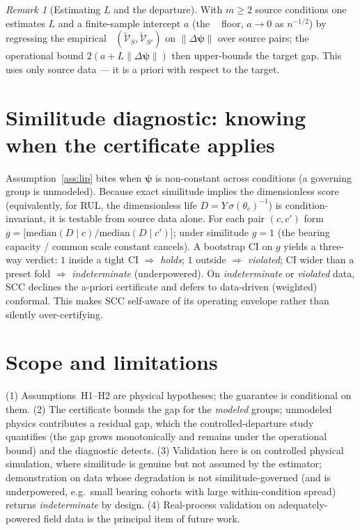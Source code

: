 \documentclass[11pt]{article}
\theoremstyle{definition}
\theoremstyle{remark}
\newtheorem{remark}{Remark}
\DeclareMathOperator{\dtv}{d_{\mathrm{TV}}}
\newcommand{\lawt}[1]{\tilde{\mathcal{V}}_{#1}}
\begin{document}
\begin{remark}[Estimating $L$ and the departure]
With $m\ge2$ source conditions one estimates $L$ and a finite-sample intercept $a$
(the $\dtv$ floor, $a\to0$ as $n^{-1/2}$) by regressing the empirical
$\dtv(\lawt S,\lawt{S'})$ on $\lVert\Delta\boldsymbol\psi\rVert$ over source pairs; the
operational bound $2(a+L\lVert\Delta\boldsymbol\psi\rVert)$ then upper-bounds the target
gap. This uses only source data --- it is a priori with respect to the target.

\end{remark}

\section{Similitude diagnostic: knowing when the certificate applies}\label{sec:diag}
Assumption~\ref{ass:lip} bites when $\boldsymbol\psi$ is non-constant across conditions
(a governing group is unmodeled). Because exact similitude implies the dimensionless score (equivalently, for
RUL, the dimensionless life $D=Y\,\sigma(\theta_c)^{-1}$) is condition-invariant, it is
testable from source data alone. For each pair $(c,c')$ form
$g=\big[\text{median}(D\mid c)/\text{median}(D\mid c')\big]$; under similitude $g=1$
(the bearing capacity / common scale constant cancels). A bootstrap CI on $g$ yields a
three-way verdict: $1$ inside a tight CI $\Rightarrow$ \emph{holds}; $1$ outside
$\Rightarrow$ \emph{violated}; CI wider than a preset fold $\Rightarrow$
\emph{indeterminate} (underpowered). On \emph{indeterminate} or \emph{violated} data,
SCC declines the a-priori certificate and defers to data-driven (weighted) conformal.
This makes SCC self-aware of its operating envelope rather than silently
over-certifying.

\section{Scope and limitations}
(1) Assumptions~H1--H2 are physical hypotheses; the guarantee is conditional on them.
(2) The certificate bounds the gap for the \emph{modeled} groups; unmodeled physics
contributes a residual gap, which the controlled-departure study quantifies (the gap
grows monotonically and remains under the operational bound) and the diagnostic
detects. (3) Validation here is on controlled physical simulation, where similitude is
genuine but not assumed by the estimator; demonstration on data whose degradation is
not similitude-governed (and is underpowered, e.g.\ small bearing cohorts with large
within-condition spread) returns \emph{indeterminate} by design. (4) Real-process
validation on adequately-powered field data is the principal item of future work.
\end{document}
